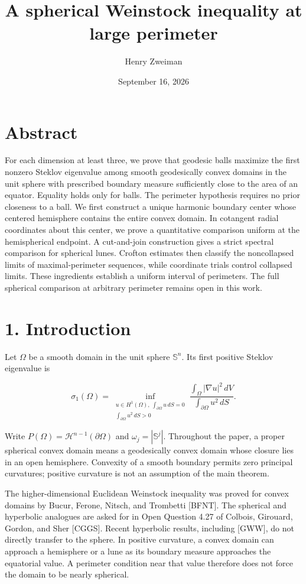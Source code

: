 \documentclass[11pt]{article}
\title{A spherical Weinstock inequality at large perimeter}
\author{Henry Zweiman}
\date{September 16, 2026}
\begin{document}
\maketitle
{}\section{Abstract}\label{abstract}

For each dimension at least three, we prove that geodesic balls maximize
the first nonzero Steklov eigenvalue among smooth geodesically convex
domains in the unit sphere with prescribed boundary measure sufficiently
close to the area of an equator. Equality holds only for balls. The
perimeter hypothesis requires no prior closeness to a ball. We first
construct a unique harmonic boundary center whose centered hemisphere
contains the entire convex domain. In cotangent radial coordinates about
this center, we prove a quantitative comparison uniform at the
hemispherical endpoint. A cut-and-join construction gives a strict
spectral comparison for spherical lunes. Crofton estimates then classify
the noncollapsed limits of maximal-perimeter sequences, while coordinate
trials control collapsed limits. These ingredients establish a uniform
interval of perimeters. The full spherical comparison at arbitrary
perimeter remains open in this work.

\section{1. Introduction}\label{introduction}

Let \(\Omega\) be a smooth domain in the unit sphere \(\mathbb S^n\).
Its first positive Steklov eigenvalue is

\[
\sigma_1(\Omega)=
\inf_{\substack{u\in H^1(\Omega),\ \int_{\partial\Omega}u\,dS=0\\
\int_{\partial\Omega}u^2\,dS>0}}
\frac{\int_\Omega|\nabla u|^2\,dV}
{\int_{\partial\Omega}u^2\,dS}.
\tag{1.1}
\]

Write \(P(\Omega)=\mathcal H^{n-1}(\partial\Omega)\) and
\(\omega_j=|\mathbb S^j|\). Throughout the paper, a proper spherical
convex domain means a geodesically convex domain whose closure lies in
an open hemisphere. Convexity of a smooth boundary permits zero
principal curvatures; positive curvature is not an assumption of the
main theorem.

The higher-dimensional Euclidean Weinstock inequality was proved for
convex domains by Bucur, Ferone, Nitsch, and Trombetti {[}BFNT{]}. The
spherical and hyperbolic analogues are asked for in Open Question 4.27
of Colbois, Girouard, Gordon, and Sher {[}CGGS{]}. Recent hyperbolic
results, including {[}GWW{]}, do not directly transfer to the sphere. In
positive curvature, a convex domain can approach a hemisphere or a lune
as its boundary measure approaches the equatorial value. A perimeter
condition near that value therefore does not force the domain to be
nearly spherical.
\end{document}
